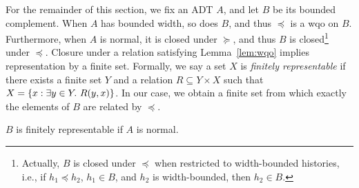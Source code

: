 For the remainder of this section, we fix an ADT $A$, and let $B$ be its bounded
complement. When $A$ has bounded width, so does $B$, and thus $\preceq$ is a wqo
on $B$. Furthermore, when $A$ is normal, it is closed under $\succeq$, and thus $B$
is closed\footnote{Actually, $B$ is closed under $\preceq$ when restricted to
width-bounded histories, i.e., if $h_1 \preceq h_2$, $h_1 \in B$, and $h_2$ is
width-bounded, then $h_2\in B$.} under $\preceq$. Closure under a relation
satisfying Lemma~\ref{lem:wqo} implies representation by a finite set. Formally,
we say a set $X$ is \emph{finitely representable} if there exists a finite set
$Y$ and a relation $R \subseteq Y \times X$ such that $X = {\{{ x : \exists
y\in Y.\ R(y,x) }\}}$. In our case, we obtain a finite set from which exactly the
elements of $B$ are related by $\preceq$.

\begin{lemma}

  $B$ is finitely representable if $A$ is normal.

\end{lemma}

